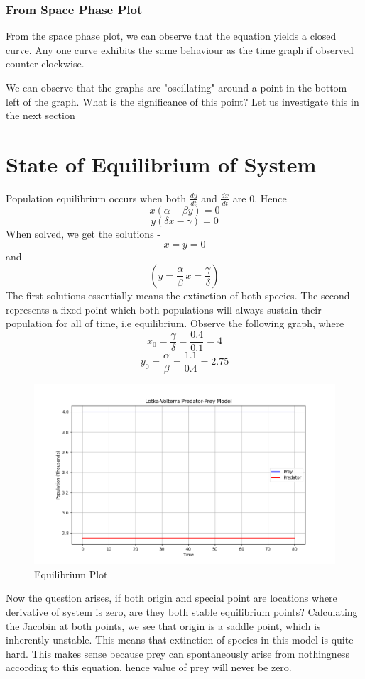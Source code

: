 \documentclass{article}
\begin{document}
\subsubsection{From Space Phase Plot}
From the space phase plot, we can observe that the equation yields a closed curve. Any one curve exhibits the same behaviour as the time graph if observed counter-clockwise.\newline

We can observe that the graphs are "oscillating" around a point in the bottom left of the graph. What is the significance of this point? Let us investigate this in the next section

\section{State of Equilibrium of System}
Population equilibrium occurs when both $\frac{dy}{dt}$ and $\frac{dx}{dt}$ are 0. Hence 
\[x(\alpha - \beta y) = 0\]
\[y(\delta x - \gamma) = 0\]
When solved, we get the solutions - 
\[x = y = 0\] and
\[\left(y = \frac{\alpha}{\beta}\,x = \frac{\gamma}{\delta}\right)\]
The first solutions essentially means the extinction of both species. The second represents a fixed point which both populations will always sustain their population for all of time, i.e equilibrium. Observe the following graph, where 
\[x_0 = \frac{\gamma}{\delta} = \frac{0.4}{0.1} = 4\]
\[y_0 = \frac{\alpha}{\beta} = \frac{1.1}{0.4} = 2.75\]
\begin{figure}[H]
    \centering
    \includegraphics[width=0.75\linewidth]{LV_EQUILIB.png}
    \caption{Equilibrium Plot}
    \label{fig:equi-plot}
\end{figure}
Now the question arises, if both origin and special point are locations where derivative of system is zero, are they both stable equilibrium points? Calculating the Jacobin at both points, we see that origin is a saddle point, which is inherently unstable. This means that extinction of species in this model is quite hard. This makes sense because prey can spontaneously arise from nothingness according to this equation, hence value of prey will never be zero.
\end{document}
